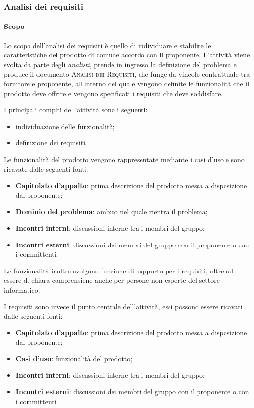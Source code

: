 \subsubsection{Analisi dei requisiti}
\label{ssub:analisi}

\paragraph{Scopo}
\label{par:analisi:scopo}

Lo scopo dell'analisi dei requisiti è quello di individuare e stabilire le caratteristiche del prodotto di comune accordo con il proponente. 
L'attività viene svolta da parte degli \emph{analisti}, prende in ingresso la definizione del problema e produce il documento 
\textsc{Analisi dei Requisiti}, che funge da vincolo contrattuale tra fornitore e proponente, all'interno del quale vengono definite 
le funzionalità che il prodotto deve offrire e vengono specificati i requisiti che deve soddisfare.

I principali compiti dell'attività sono i seguenti:
\begin{itemize}
	\item individuazione delle funzionalità;
	\item definizione dei requisiti.
\end{itemize}

Le funzionalità del prodotto vengono rappresentate mediante i casi d'uso e sono ricavate dalle seguenti fonti:
\begin{itemize}
    \item \textbf{Capitolato d'appalto}: prima descrizione del prodotto messa a disposizione dal proponente;
    \item \textbf{Dominio del problema}: ambito nel quale rientra il problema;
    \item \textbf{Incontri interni}: discussioni interne tra i membri del gruppo;
    \item \textbf{Incontri esterni}: discussioni dei membri del gruppo con il proponente o con i committenti.
\end{itemize}
Le funzionalità inoltre svolgono funzione di supporto per i requisiti, oltre ad essere 
di chiara comprensione anche per persone non esperte del settore informatico.

I requisiti sono invece il punto centrale dell'attività, essi possono essere ricavati dalle seguenti fonti:
\begin{itemize}
    \item \textbf{Capitolato d'appalto}: prima descrizione del prodotto messa a disposizione dal proponente;
    \item \textbf{Casi d'uso}: funzionalità del prodotto;
    \item \textbf{Incontri interni}: discussioni interne tra i membri del gruppo;
    \item \textbf{Incontri esterni}: discussioni dei membri del gruppo con il proponente o con i committenti.
\end{itemize}

